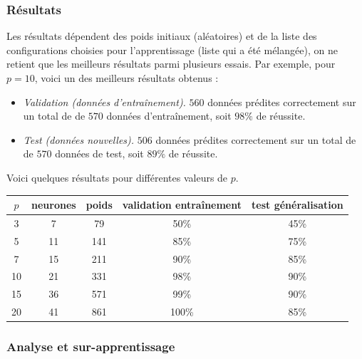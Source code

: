 \subsubsection*{Résultats}

Les résultats dépendent des poids initiaux (aléatoires) et de la liste des configurations choisies pour l'apprentissage (liste qui a été mélangée), on ne retient que les meilleurs résultats parmi plusieurs essais.
Par exemple, pour $p=10$, voici un des meilleurs résultats obtenus :
\begin{itemize}
	\item \emph{Validation (données d'entraînement).} $560$ données prédites correctement sur un total de de $570$ données d'entraînement, soit $98\%$ de réussite.
	
	\item \emph{Test (données nouvelles).} $506$ données prédites correctement sur un total de de $570$ données de test, soit $89\%$ de réussite.
\end{itemize}

Voici quelques résultats pour différentes valeurs de $p$.

\begin{center}
	\begin{tabular}{c|c|c|c|c}
		$p$ & {neurones} & {poids} & {validation entraînement} & {test généralisation} \\ \hline
		3 & 7 & 79 & 50\% & 45\% \\
		5 & 11 & 141 & 85\% & 75\% \\
		7 & 15 & 211 & 90\% & 85\% \\
		10 & 21 & 331 & 98\% & 90\% \\
		15 & 36 & 571 & 99\% & 90\% \\
		20 & 41 & 861 & 100\% & 85\% \\
	\end{tabular}
\end{center}

\subsubsection*{Analyse et sur-apprentissage}

